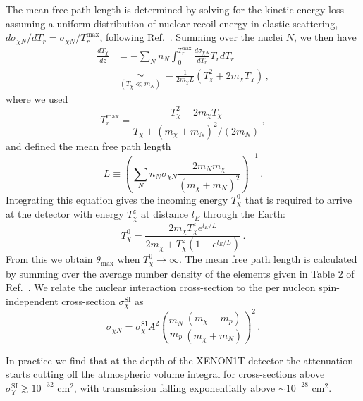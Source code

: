 \documentclass[prl,twocolumn,groupedaddress,nofootinbib, superscriptaddress]{revtex4-1}
\begin{document}
The mean free path length is determined by solving for the kinetic energy loss assuming a uniform distribution of nuclear recoil energy in elastic scattering, $d\sigma_{\chi N}/dT_r = \sigma_{\chi N} / T_r^\text{max}$, following Ref.~\cite{Bringmann:2018cvk}. Summing over the nuclei $N$, we then have
%
\begin{align}
\frac{dT_\chi}{dz} &= - \sum_N n_N \int_0^{T_r^\text{max}} \frac{d\sigma_{\chi N}}{dT_r} T_r dT_r \nonumber \\
&\underset{(T_\chi \ll m_N) }{\simeq} -\frac{1}{2m_\chi L}\left(T_\chi^2 + 2 m_\chi T_\chi \right) \, ,
\end{align}
%
where we used
%
\begin{equation}
T_r^\text{max} = \frac{T_\chi^2 + 2m_\chi T_\chi}{T_\chi + (m_\chi + m_N)^2/(2m_N)} \, ,
\end{equation}
%
and defined the mean free path length
%
\begin{equation}
L \equiv \left( \sum_N n_N \sigma_{\chi N} \frac{2 m_N m_\chi}{(m_\chi + m_N)^2} \right)^{-1} \, .
\end{equation}
%
Integrating this equation gives the incoming energy $T_\chi^0$ that is required to arrive at the detector with energy $T_\chi^z$ at distance $l_E$ through the Earth:
%
\begin{equation}
T_\chi^0 = \frac{2 m_\chi T_\chi^z e^{l_E/L}}{2 m_\chi + T_\chi^z(1-e^{l_E/L})} \, .
\end{equation}
%
From this we obtain $\theta_\text{max}$ when $T_\chi^0 \to \infty$. The mean free path length is calculated by summing over the average number density of the elements given in Table 2 of Ref.~\cite{Kavanagh:2016pyr}. We relate the nuclear interaction cross-section to the per nucleon spin-independent cross-section $\sigma_\chi^\text{SI}$ as
%
\begin{equation}
\sigma_{\chi N} = \sigma_\chi^\text{SI} A^2 \left(\frac{m_N}{m_p} \frac{(m_\chi + m_p)}{(m_\chi + m_N)} \right)^2 \, .
\end{equation} 
%

In practice we find that at the depth of the XENON1T detector the attenuation starts cutting off the atmospheric volume integral for cross-sections above $\sigma_\chi^\text{SI} \gtrsim 10^{-32} \text{ cm}^2$, with transmission falling exponentially above $\sim 10^{-28} \text{ cm}^2$. 

\end{document}
